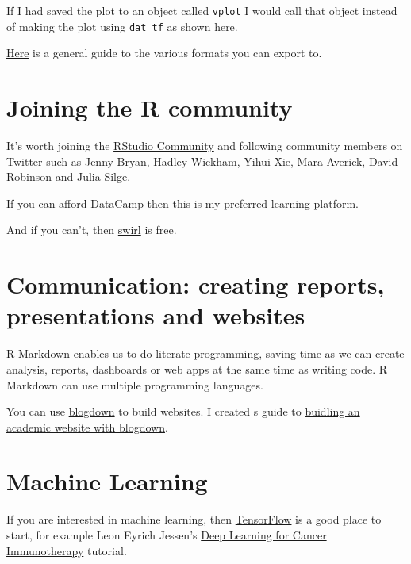 \documentclass[12pt,]{book}
\theoremstyle{definition}
\theoremstyle{definition}
\theoremstyle{definition}
\theoremstyle{remark}
\begin{document}
If I had saved the plot to an object called \texttt{vplot} I would call
that object instead of making the plot using \texttt{dat\_tf} as shown
here.

\href{https://www.stat.berkeley.edu/classes/s133/saving.html}{Here} is a
general guide to the various formats you can export to.

\section{Joining the R community}\label{joining-the-r-community}

It's worth joining the \href{https://community.rstudio.com/}{RStudio
Community} and following community members on Twitter such as
\href{https://twitter.com/JennyBryan}{Jenny Bryan},
\href{https://twitter.com/hadleywickham}{Hadley Wickham},
\href{https://twitter.com/xieyihui}{Yihui Xie},
\href{https://twitter.com/dataandme}{Mara Averick},
\href{https://twitter.com/drob}{David Robinson} and
\href{https://twitter.com/juliasilge}{Julia Silge}.

If you can afford \href{https://www.datacamp.com}{DataCamp} then this is
my preferred learning platform.

And if you can't, then \href{https://swirlstats.com/}{swirl} is free.

\section{Communication: creating reports, presentations and
websites}\label{communication-creating-reports-presentations-and-websites}

\href{https://rmarkdown.rstudio.com/lesson-1.html}{R Markdown} enables
us to do
\href{https://en.wikipedia.org/wiki/Literate_programming}{literate
programming}, saving time as we can create analysis, reports, dashboards
or web apps at the same time as writing code. R Markdown can use
multiple programming languages.

You can use \href{https://bookdown.org/yihui/blogdown/}{blogdown} to
build websites. I created s guide to
\href{http://ab604.github.io/docs/website_bookdown/}{buidling an
academic website with blogdown}.

\section{Machine Learning}\label{machine-learning}

If you are interested in machine learning, then
\href{https://tensorflow.rstudio.com/}{TensorFlow} is a good place to
start, for example Leon Eyrich Jessen's
\href{https://tensorflow.rstudio.com/blog/dl-for-cancer-immunotherapy.html}{Deep
Learning for Cancer Immunotherapy} tutorial.


\end{document}
